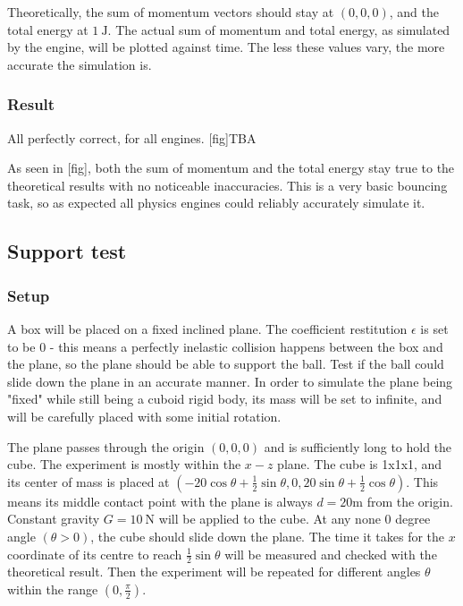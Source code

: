 \documentclass[12pt,a4paper,twoside,openright]{report}
\begin{document}
Theoretically, the sum of momentum vectors should stay at $(0, 0, 0)$, and the total energy at $\SI{1}{\J}$.
The actual sum of momentum and total energy, as simulated by the engine, will be plotted against time.
The less these values vary, the more accurate the simulation is.

\subsubsection{Result}

All perfectly correct, for all engines. [fig]TBA

As seen in [fig], both the sum of momentum and the total energy stay true to the theoretical results with no noticeable inaccuracies. This is a very basic bouncing task, so as expected all physics engines could reliably accurately simulate it.

\subsection{Support test}

\subsubsection{Setup}

A box will be placed on a fixed inclined plane. The coefficient restitution $\epsilon$ is set to be $0$ - this means a perfectly inelastic collision happens between the box and the plane, so the plane should be able to support the ball. Test if the ball could slide down the plane in an accurate manner. In order to simulate the plane being "fixed" while still being a cuboid rigid body, its mass will be set to infinite, and will be carefully placed with some initial rotation.

The plane passes through the origin $(0, 0, 0)$ and is sufficiently long to hold the cube. The experiment is mostly within the $x-z$ plane. The cube is 1x1x1, and its center of mass is placed at $(-20\cos \theta + \frac{1}{2}\sin \theta, 0, 20\sin\theta+\frac{1}{2}\cos \theta)$. This means its middle contact point with the plane is always $d=20$m from the origin. Constant gravity $G = \SI{10}{\N}$ will be applied to the cube. At any none $0$ degree angle $(\theta > 0)$, the cube should slide down the plane. The time it takes for the $x$ coordinate of its centre to reach $\frac{1}{2}\sin \theta$ will be measured and checked with the theoretical result. Then the experiment will be repeated for different angles $\theta$ within the range $(0, \frac{\pi}{2})$.
\end{document}
